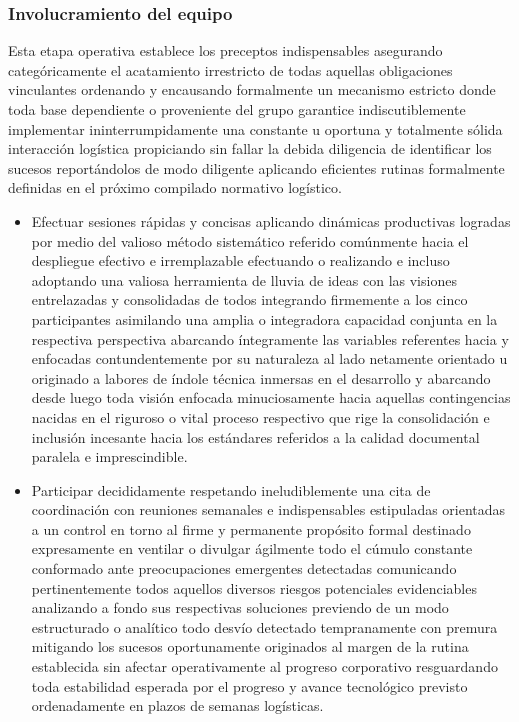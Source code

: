 \documentclass[11pt,spanish]{article}
\begin{document}
\subsubsection{Involucramiento del equipo}

Esta etapa operativa establece los preceptos indispensables asegurando categóricamente el acatamiento irrestricto de todas aquellas obligaciones vinculantes ordenando y encausando formalmente un mecanismo estricto donde toda base dependiente o proveniente del grupo garantice indiscutiblemente implementar ininterrumpidamente una constante u oportuna y totalmente sólida interacción logística propiciando sin fallar la debida diligencia de identificar los sucesos reportándolos de modo diligente aplicando eficientes rutinas formalmente definidas en el próximo compilado normativo logístico.

\begin{itemize}
    \item Efectuar sesiones rápidas y concisas aplicando dinámicas productivas logradas por medio del valioso método sistemático referido comúnmente hacia el despliegue efectivo e irremplazable efectuando o realizando e incluso adoptando una valiosa herramienta de lluvia de ideas con las visiones entrelazadas y consolidadas de todos integrando firmemente a los cinco participantes asimilando una amplia o integradora capacidad conjunta en la respectiva perspectiva abarcando íntegramente las variables referentes hacia y enfocadas contundentemente por su naturaleza al lado netamente orientado u originado a labores de índole técnica inmersas en el desarrollo y abarcando desde luego toda visión enfocada minuciosamente hacia aquellas contingencias nacidas en el riguroso o vital proceso respectivo que rige la consolidación e inclusión incesante hacia los estándares referidos a la calidad documental paralela e imprescindible.
    \item Participar decididamente respetando ineludiblemente una cita de coordinación con reuniones semanales e indispensables estipuladas orientadas a un control en torno al firme y permanente propósito formal destinado expresamente en ventilar o divulgar ágilmente todo el cúmulo constante conformado ante preocupaciones emergentes detectadas comunicando pertinentemente todos aquellos diversos riesgos potenciales evidenciables analizando a fondo sus respectivas soluciones previendo de un modo estructurado o analítico todo desvío detectado tempranamente con premura mitigando los sucesos oportunamente originados al margen de la rutina establecida sin afectar operativamente al progreso corporativo resguardando toda estabilidad esperada por el progreso y avance tecnológico previsto ordenadamente en plazos de semanas logísticas.
\end{itemize}
\end{document}
